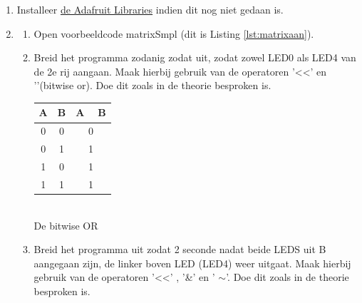 \begin{enumerate}
	\item Installeer \href{https://learn.adafruit.com/use-micro-bit-with-arduino/adafruit-libraries}{de Adafruit Libraries} indien dit nog niet gedaan is.
	\item
	\begin{enumerate}

	\item Open voorbeeldcode matrixSmpl (dit is Listing \ref{lst:matrixaan}). 
	\item Breid het programma zodanig zodat uit, zodat zowel LED0 als LED4 van de 2e rij aangaan. Maak hierbij gebruik van de operatoren '\textless\textless' en '\textbar'(bitwise or). Doe dit zoals in de theorie besproken is.
	
\setlength\arrayrulewidth{2pt}
		\begin{tabular}{|c|c|c|}
			\hline
          \rowcolor{yellow}
		    A  & B     & A \textbar~ B       \\ \hline          
		    0  & 0     & 0       \\ \hline
			0      & 1     & 1       \\ \hline
			1     & 0     & 1       \\ \hline
			1    & 1     & 1       \\ \hline
		\end{tabular}\\
De bitwise OR 
	
	\item Breid het programma uit zodat 2 seconde nadat beide LEDS uit B aangegaan zijn, de linker boven LED (LED4) weer uitgaat. Maak hierbij gebruik van de operatoren '\textless\textless' ,  '\&' en  ' $\sim$'. Doe dit zoals in de theorie besproken is.
	

\end{enumerate}
\end{enumerate}
